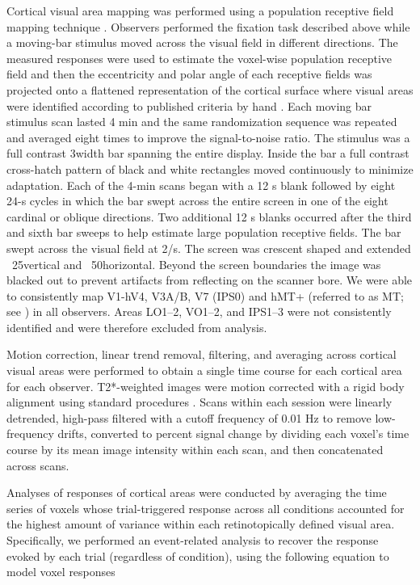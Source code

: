 \documentclass{report}
\begin{document}
Cortical visual area mapping was performed using a population receptive field mapping technique \citep{Dumoulin2008-uc}. Observers performed the fixation task described above while a moving-bar stimulus moved across the visual field in different directions. The measured responses were used to estimate the voxel-wise population receptive field and then the eccentricity and polar angle of each receptive fields was projected onto a flattened representation of the cortical surface where visual areas were identified according to published criteria by hand \citep{Gardner2008-yx,Wandell2007-pr}. Each moving bar stimulus scan lasted 4 min and the same randomization sequence was repeated and averaged eight times to improve the signal-to-noise ratio. The stimulus was a full contrast 3\degree width bar spanning the entire display. Inside the bar a full contrast cross-hatch pattern of black and white rectangles moved continuously to minimize adaptation. Each of the 4-min scans began with a 12 s blank followed by eight 24-s cycles in which the bar swept across the entire screen in one of the eight cardinal or oblique directions. Two additional 12 s blanks occurred after the third and sixth bar sweeps to help estimate large population receptive fields. The bar swept across the visual field at 2\degree /s. The screen was crescent shaped and extended ~25\degree vertical and ~50\degree horizontal. Beyond the screen boundaries the image was blacked out to prevent artifacts from reflecting on the scanner bore. We were able to consistently map V1-hV4, V3A/B, V7 (IPS0) and hMT+ (referred to as MT; see \citet{Huk2002-wq,Amano2009-ob}) in all observers. Areas LO1–2, VO1–2, and IPS1–3 were not consistently identified and were therefore excluded from analysis.

Motion correction, linear trend removal, filtering, and averaging across cortical visual areas were performed to obtain a single time course for each cortical area for each observer. T2*-weighted images were motion corrected with a rigid body alignment using standard procedures \citep{Nestares2000-by}. Scans within each session were linearly detrended, high-pass filtered with a cutoff frequency of 0.01 Hz to remove low-frequency drifts, converted to percent signal change by dividing each voxel’s time course by its mean image intensity within each scan, and then concatenated across scans.

Analyses of responses of cortical areas were conducted by averaging the time series of voxels whose trial-triggered response across all conditions accounted for the highest amount of variance within each retinotopically defined visual area. Specifically, we performed an event-related analysis to recover the response evoked by each trial (regardless of condition), using the following equation to model voxel responses
\end{document}
